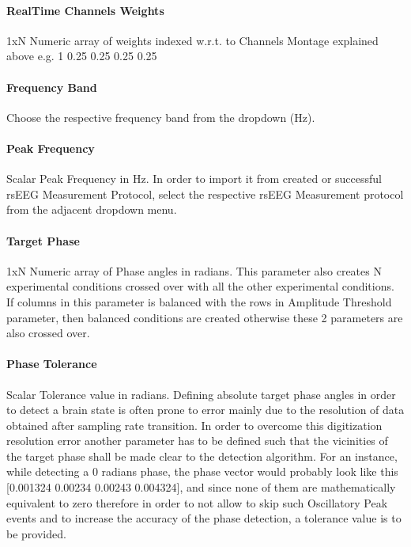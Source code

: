 \documentclass[letterpaper,10pt,english]{sphinxmanual}
\begin{document}
\paragraph{Real\sphinxhyphen{}Time Channels Weights}
\label{\detokenize{11_TEPMeasurement:real-time-channels-weights}}
\sphinxAtStartPar
1xN Numeric array of weights indexed w.r.t. to Channels Montage explained above e.g. 1 \sphinxhyphen{}0.25 \sphinxhyphen{}0.25 \sphinxhyphen{}0.25 \sphinxhyphen{}0.25


\paragraph{Frequency Band}
\label{\detokenize{11_TEPMeasurement:frequency-band}}
\sphinxAtStartPar
Choose the respective frequency band from the dropdown (Hz).


\paragraph{Peak Frequency}
\label{\detokenize{11_TEPMeasurement:peak-frequency}}
\sphinxAtStartPar
Scalar Peak Frequency in Hz. In order to import it from created or successful rsEEG Measurement Protocol, select the respective rsEEG Measurement protocol from the adjacent dropdown menu.


\paragraph{Target Phase}
\label{\detokenize{11_TEPMeasurement:target-phase}}
\sphinxAtStartPar
1xN Numeric array of Phase angles in radians. This parameter also creates N experimental conditions crossed over with all the other experimental conditions. If columns in this parameter is balanced with the rows in Amplitude Threshold parameter, then balanced conditions are created otherwise these 2 parameters are also crossed over.


\paragraph{Phase Tolerance}
\label{\detokenize{11_TEPMeasurement:phase-tolerance}}
\sphinxAtStartPar
Scalar Tolerance value in radians. Defining absolute target phase angles in order to detect a brain state is often prone to error mainly due to the resolution of data obtained after sampling rate transition. In order to overcome this digitization resolution error another parameter has to be defined such that the vicinities of the target phase shall be made clear to the detection algorithm. For an instance, while detecting a 0 radians phase, the phase vector would probably look like this {[}\sphinxhyphen{}0.001324 \sphinxhyphen{}0.00234 0.00243 0.004324{]}, and since none of them are mathematically equivalent to zero therefore in order to not allow to skip such Oscillatory Peak events and to increase the accuracy of the phase detection, a tolerance value is to be provided.
\end{document}
